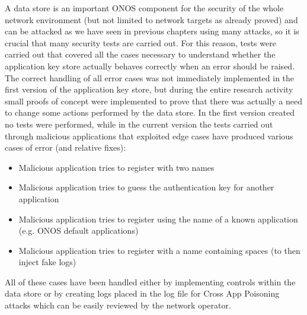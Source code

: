 A data store is an important ONOS component for the security of the whole network environment (but not limited to network targets as already proved) and can be attacked as we have seen in previous chapters using many attacks, so it is crucial that many security tests are carried out. For this reason, tests were carried out that covered all the cases necessary to understand whether the application key store actually behaves correctly when an error should be raised. The correct handling of all error cases was not immediately implemented in the first version of the application key store, but during the entire research activity small proofs of concept were implemented to prove that there was actually a need to change some actions performed by the data store. In the first version created no tests were performed, while in the current version the tests carried out through malicious applications that exploited edge cases have produced various cases of error (and relative fixes):
\begin{itemize}
\item Malicious application tries to register with two names
\item Malicious application tries to guess the authentication key for another application
\item Malicious application tries to register using the name of a known application (e.g. ONOS default applications)
\item Malicious application tries to register with a name containing spaces (to then inject fake logs)
\end{itemize}
All of these cases have been handled either by implementing controls within the data store or by creating logs placed in the log file for Cross App Poisoning attacks which can be easily reviewed by the network operator.
\medskip

